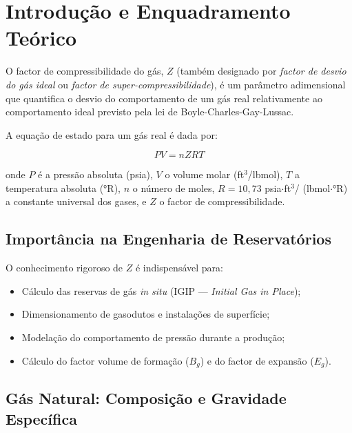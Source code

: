 \documentclass[12pt, a4paper]{article}
\begin{document}
\tableofcontents
\newpage

\section{Introdução e Enquadramento Teórico}

O factor de compressibilidade do gás, $Z$ (também designado por \textit{factor de
desvio do gás ideal} ou \textit{factor de super-compressibilidade}), é um parâmetro
adimensional que quantifica o desvio do comportamento de um gás real relativamente
ao comportamento ideal previsto pela lei de Boyle-Charles-Gay-Lussac.

A equação de estado para um gás real é dada por:

\begin{equation}\label{eq:eos}
  PV = nZRT
\end{equation}

\noindent onde $P$ é a pressão absoluta (psia), $V$ o volume molar (ft$^3$/lbmol),
$T$ a temperatura absoluta (°R), $n$ o número de moles, $R = 10{,}73$ psia$\cdot$ft$^3$/
(lbmol$\cdot$°R) a constante universal dos gases, e $Z$ o factor de
compressibilidade.

\subsection{Importância na Engenharia de Reservatórios}

O conhecimento rigoroso de $Z$ é indispensável para:
\begin{itemize}[leftmargin=1.5cm]
  \item Cálculo das reservas de gás \textit{in situ} (IGIP — \textit{Initial Gas
        in Place});
  \item Dimensionamento de gasodutos e instalações de superfície;
  \item Modelação do comportamento de pressão durante a produção;
  \item Cálculo do factor volume de formação ($B_g$) e do factor de expansão ($E_g$).
\end{itemize}

\subsection{Gás Natural: Composição e Gravidade Específica}
\end{document}
